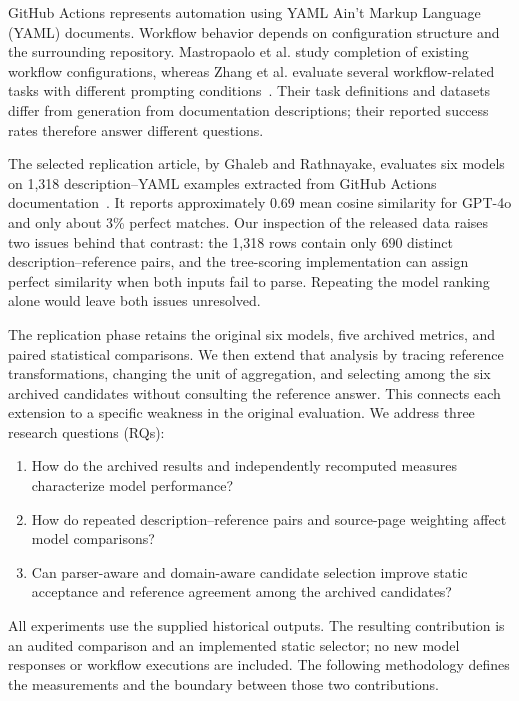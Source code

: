 GitHub Actions represents automation using YAML Ain't Markup Language (YAML) documents. Workflow behavior depends on configuration structure and the surrounding repository. Mastropaolo et al. study completion of existing workflow configurations, whereas Zhang et al. evaluate several workflow-related tasks with different prompting conditions~\cite{mastropaolo2024,zhang2024}. Their task definitions and datasets differ from generation from documentation descriptions; their reported success rates therefore answer different questions.

The selected replication article, by Ghaleb and Rathnayake, evaluates six models on 1,318 description--YAML examples extracted from GitHub Actions documentation~\cite{ghaleb2025}. It reports approximately 0.69 mean cosine similarity for GPT-4o and only about 3\% perfect matches. Our inspection of the released data raises two issues behind that contrast: the 1,318 rows contain only 690 distinct description--reference pairs, and the tree-scoring implementation can assign perfect similarity when both inputs fail to parse. Repeating the model ranking alone would leave both issues unresolved.

The replication phase retains the original six models, five archived metrics, and paired statistical comparisons. We then extend that analysis by tracing reference transformations, changing the unit of aggregation, and selecting among the six archived candidates without consulting the reference answer. This connects each extension to a specific weakness in the original evaluation. We address three research questions (RQs):
\begin{enumerate}[label=\textbf{RQ\arabic*.}]
\item How do the archived results and independently recomputed measures characterize model performance?
\item How do repeated description--reference pairs and source-page weighting affect model comparisons?
\item Can parser-aware and domain-aware candidate selection improve static acceptance and reference agreement among the archived candidates?
\end{enumerate}

All experiments use the supplied historical outputs. The resulting contribution is an audited comparison and an implemented static selector; no new model responses or workflow executions are included. The following methodology defines the measurements and the boundary between those two contributions.

